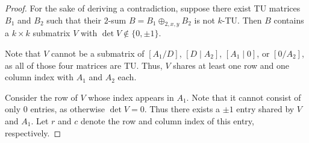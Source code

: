 \documentclass{article}
\theoremstyle{definition}
\begin{document}
\begin{proof}
    For the sake of deriving a contradiction, suppose there exist TU matrices $B_{1}$ and $B_{2}$ such that their $2$-sum $B = B_{1} \oplus_{2, x, y} B_{2}$ is not $k$-TU. Then $B$ contains a $k \times k$ submatrix $V$ with $\det V \notin \{0, \pm 1\}$.

    Note that $V$ cannot be a submatrix of $\left[A_{1} / D\right]$, $\left[D \mid A_{2}\right]$, $\left[A_{1} \mid 0\right]$, or $\left[0 / A_{2}\right]$, as all of those four matrices are TU. Thus, $V$ shares at least one row and one column index with $A_{1}$ and $A_{2}$ each.

    Consider the row of $V$ whose index appears in $A_{1}$. Note that it cannot consist of only $0$ entries, as otherwise $\det V = 0$. Thus there exists a $\pm 1$ entry shared by $V$ and $A_{1}$. Let $r$ and $c$ denote the row and column index of this entry, respectively.


\end{proof}
\end{document}
